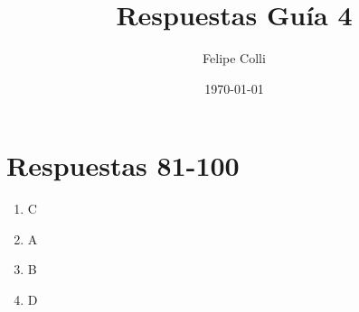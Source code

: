 \documentclass[11pt]{article}
\title{Respuestas Guía 4}
\author{Felipe Colli}
\date{\today}
\begin{document}
\maketitle

\section{Respuestas 81-100}
\begin{enumerate}
    \item C %
    \item A %
    \item B %
    \item D %
\end{enumerate}

\end{document}

